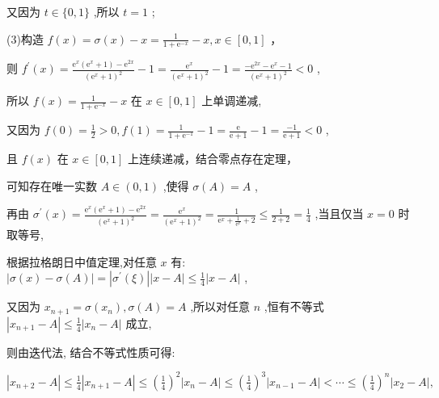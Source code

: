 \documentclass[10pt]{article}
\begin{document}
又因为 \(t \in  \{ 0,1\}\) ,所以 \(t = 1\) ;

(3)构造 \(f\left( x\right)  = \sigma \left( x\right)  - x = \frac{1}{1 + {\mathrm{e}}^{-x}} - x, x \in  \left\lbrack  {0,1}\right\rbrack\) ，

则 \({f}^{\prime }\left( x\right)  = \frac{{\mathrm{e}}^{x}\left( {{\mathrm{e}}^{x} + 1}\right)  - {\mathrm{e}}^{2x}}{{\left( {\mathrm{e}}^{x} + 1\right) }^{2}} - 1 = \frac{{\mathrm{e}}^{x}}{{\left( {\mathrm{e}}^{x} + 1\right) }^{2}} - 1 = \frac{-{\mathrm{e}}^{2x} - {\mathrm{e}}^{x} - 1}{{\left( {\mathrm{e}}^{x} + 1\right) }^{2}} < 0\) ,

所以 \(f\left( x\right)  = \frac{1}{1 + {\mathrm{e}}^{-x}} - x\) 在 \(x \in  \left\lbrack  {0,1}\right\rbrack\) 上单调递减,

又因为 \(f\left( 0\right)  = \frac{1}{2} > 0, f\left( 1\right)  = \frac{1}{1 + {\mathrm{e}}^{-1}} - 1 = \frac{\mathrm{e}}{\mathrm{e} + 1} - 1 = \frac{-1}{\mathrm{e} + 1} < 0\) ,

且 \(f\left( x\right)\) 在 \(x \in  \left\lbrack  {0,1}\right\rbrack\) 上连续递减，结合零点存在定理，

可知存在唯一实数 \(A \in  \left( {0,1}\right)\) ,使得 \(\sigma \left( A\right)  = A\) ,

再由 \({\sigma }^{\prime }\left( x\right)  = \frac{{\mathrm{e}}^{x}\left( {{\mathrm{e}}^{x} + 1}\right)  - {\mathrm{e}}^{2x}}{{\left( {\mathrm{e}}^{x} + 1\right) }^{2}} = \frac{{\mathrm{e}}^{x}}{{\left( {\mathrm{e}}^{x} + 1\right) }^{2}} = \frac{1}{{\mathrm{e}}^{x} + \frac{1}{{\mathrm{e}}^{x}} + 2} \leq  \frac{1}{2 + 2} = \frac{1}{4}\) ,当且仅当 \(x = 0\) 时取等号,

根据拉格朗日中值定理,对任意 \(x\) 有: \(\left| {\sigma \left( x\right)  - \sigma \left( A\right) }\right|  = \left| {{\sigma }^{\prime }\left( \xi \right) }\right| \left| {x - A}\right|  \leq  \frac{1}{4}\left| {x - A}\right|\) ,

又因为 \({x}_{n + 1} = \sigma \left( {x}_{n}\right) ,\sigma \left( A\right)  = A\) ,所以对任意 \(n\) ,恒有不等式 \(\left| {{x}_{n + 1} - A}\right|  \leq  \frac{1}{4}\left| {{x}_{n} - A}\right|\) 成立,

则由迭代法, 结合不等式性质可得:

\(\left| {{x}_{n + 2} - A}\right|  \leq  \frac{1}{4}\left| {{x}_{n + 1} - A}\right|  \leq  {\left( \frac{1}{4}\right) }^{2}\left| {{x}_{n} - A}\right|  \leq  {\left( \frac{1}{4}\right) }^{3}\left| {{x}_{n - 1} - A}\right|  < \cdots  \leq  {\left( \frac{1}{4}\right) }^{n}\left| {{x}_{2} - A}\right| ,\)
\end{document}
